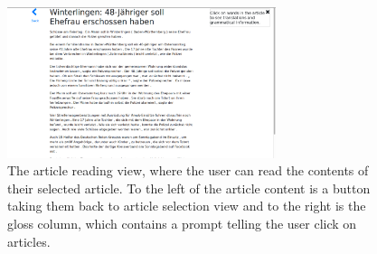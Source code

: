 \begin{figure}
	\caption[Screenshot of the Article Reading View]{The article reading view, where the user can read the contents of their selected article. To the left of the article content is a button taking them back to article selection view and to the right is the gloss column, which contains a prompt telling the user click on articles. }
	\label{fig:view3}
	\begin{center}
	\includegraphics[width=0.7\textwidth]{Graphics/View3}
\end{center}
\end{figure}